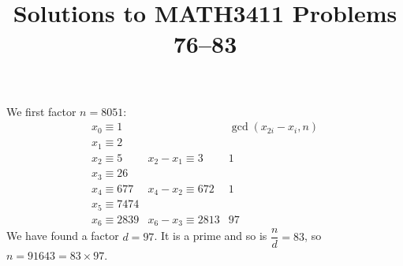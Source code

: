 \documentclass[11pt]{article}
\date{}
\author{}
\title{\sc Solutions to MATH3411 Problems 76--83}
\begin{document}
 \maketitle

\vspace*{-10mm}

We first factor $n = 8051$:
\[
  \begin{array}{llc}
    x_0 \equiv 1         &                       & \gcd(x_{2i} - x_i, n)\\
    x_1 \equiv 2\\
    x_2 \equiv 5         & x_2 - x_1 \equiv 3    &                  1\\
    x_3 \equiv 26\\
    x_4 \equiv 677       & x_4 - x_2 \equiv 672  &                  1\\
    x_5 \equiv 7474\\
    x_6 \equiv 2839      & x_6 - x_3 \equiv 2813 &                 97
  \end{array}
\]
We have found a factor $d = 97$.
It is a prime and so is $\dfrac{n}{d} = 83$,
so $n = 91643 = 83\times 97$.
\end{document}
